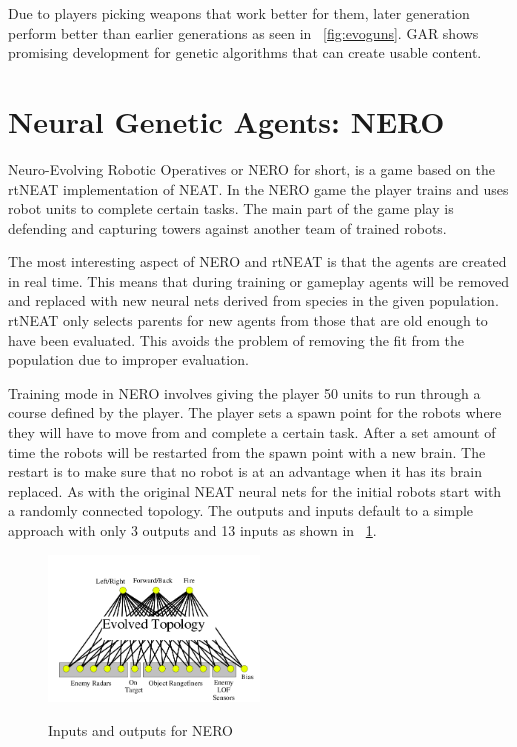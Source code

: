 \documentclass[12pt]{ucthesis} \newif\ifpdf \ifx\pdfoutput\undefined
\begin{document}
Due to players picking weapons that work better for them,
later generation perform better than earlier generations as seen in
~\ref{fig:evoguns}. GAR shows promising development for genetic algorithms that can create usable
content.

\section{Neural Genetic Agents: NERO}
  
Neuro-Evolving Robotic Operatives or NERO for short, is a game based on the
rtNEAT implementation of NEAT\cite{stanley:cig05}. In the NERO game the player
trains and uses robot units to complete certain tasks. The main part of the game play is
defending and capturing towers against another team of trained robots.

The most interesting aspect of NERO and rtNEAT is that the agents are created in
real time. This means that during training or gameplay agents will be removed
and replaced with new neural nets derived from species in the given population.
rtNEAT only selects parents for new agents from those that are old enough to
have been evaluated. This avoids the problem of removing the fit from the
population due to improper evaluation.

Training mode in NERO involves giving the player 50 units to run through a
course defined by the player. The player sets a spawn point for the robots where
they will have to move from and complete a certain task. After a set amount of
time the robots will be restarted from the spawn point with a new brain. The
restart is to make sure that no robot is at an advantage when it has its brain
replaced. As with the original NEAT neural nets for the initial robots start
with a randomly connected topology. The outputs and inputs default to a simple
approach with only 3 outputs and 13 inputs as shown in ~\ref{fig:topology}.

\begin{figure}[h!] 
\caption{Inputs and outputs for NERO}
  \centering
    \includegraphics[width=0.5\textwidth]{topology.png}
   \label{fig:topology} 
\end{figure}
\end{document}
